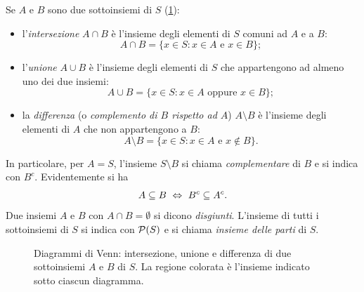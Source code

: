 \begin{definizione}
Se $A$ e $B$ sono due sottoinsiemi di $S$ (\cref{fig:venn}):
\begin{itemize}
  \item l'\emph{intersezione} $A\cap B$ è l'insieme degli elementi di $S$ comuni ad $A$ e
  a $B$:
  \[ A\cap B = \{x\in S : x\in A \text{ e } x\in B\}; \]
  \item l'\emph{unione} $A\cup B$ è l'insieme degli elementi di $S$ che appartengono ad
  almeno uno dei due insiemi:
  \[ A\cup B = \{x\in S : x\in A \text{ oppure } x\in B\}; \]
  \item la \emph{differenza} (o \emph{complemento di $B$ rispetto ad $A$}) $A\setminus B$
  è l'insieme degli elementi di $A$ che non appartengono a $B$:
  \[ A\setminus B = \{x\in S : x\in A \text{ e } x\notin B\}. \]
\end{itemize}
In particolare, per $A=S$, l'insieme $S\setminus B$ si chiama \emph{complementare} di
$B$ e si indica con $B^{c}$. Evidentemente si ha
\begin{equation}\label{eq:inclusione-complementari}
  A\subseteq B \ \Leftrightarrow\ B^{c}\subseteq A^{c}.
\end{equation}
Due insiemi $A$ e $B$ con $A\cap B=\emptyset$ si dicono \emph{disgiunti}. L'insieme di
tutti i sottoinsiemi di $S$ si indica con $\mathcal{P}(S)$ e si chiama \emph{insieme delle
parti} di $S$.
\end{definizione}

\begin{figure}[htb]
\centering
{}
\caption{Diagrammi di Venn: intersezione, unione e differenza di due sottoinsiemi $A$ e
$B$ di $S$. La regione colorata è l'insieme indicato sotto ciascun diagramma.}
\label{fig:venn}
\end{figure}

